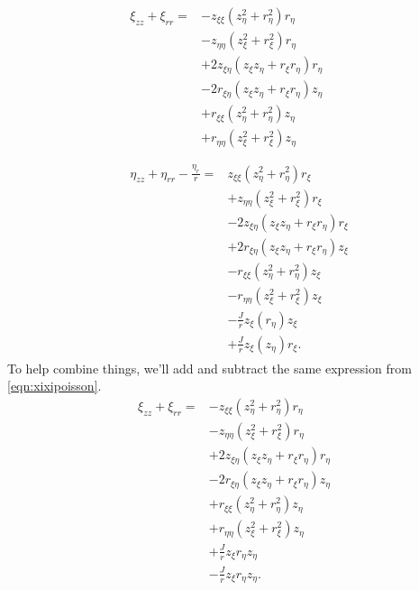 \begin{subequations}
\begin{align}
	&\begin{split}
		\xi_{zz} + \xi_{rr} =&- z_{\xi\xi} ( z_\eta^2 + r_\eta^2)  r_\eta\\
		&- z_{\eta\eta} (z_\xi^2 + r_\xi^2)  r_\eta  \\
		&+ 2z_{\xi\eta} (z_\xi z_\eta + r_\xi r_\eta)  r_\eta   \\
		&- 2r_{\xi\eta} (z_\xi z_\eta + r_\xi  r_\eta)  z_\eta \\
		&+ r_{\xi\xi} ( z_\eta^2 + r_\eta^2)  z_\eta \\
		&+ r_{\eta\eta} (  z_\xi^2  + r_\xi^2) z_\eta  \\
	\end{split} \\[1em]
    \label{eqn:etaetapoisson}
	&\begin{split}
		\eta_{zz} + \eta_{rr} - \frac{\eta_r}{r}=& z_{\xi\xi} (z_\eta^2 +  r_\eta^2)  r_\xi \\
		&+ z_{\eta\eta} (z_\xi^2 + r_\xi^2 )  r_\xi \\
		&- 2z_{\xi\eta} (z_\xi z_\eta + r_\xi r_\eta ) r_\xi  \\
		&+ 2 r_{\xi\eta} ( z_\xi z_\eta +  r_\xi  r_\eta)  z_\xi \\
		&- r_{\xi\xi} ( z_\eta^2 + r_\eta^2 ) z_\xi \\
		&- r_{\eta\eta} (z_\xi^2 + r_\xi^2 ) z_\xi \\
		&- \frac{J}{r}z_\xi( r_\eta ) z_\xi\\
		&+ \frac{J}{r}z_\xi(z_\eta) r_\xi.
	\end{split}
\end{align}
\end{subequations}
%
To help combine things, we'll add and subtract the same expression from \cref{eqn:xixipoisson}.
%
\begin{equation}
    \label{eqn:xixipoisson}
    \begin{aligned}
		\xi_{zz} + \xi_{rr} =&- z_{\xi\xi} ( z_\eta^2 + r_\eta^2)  r_\eta\\
		&- z_{\eta\eta} (z_\xi^2 + r_\xi^2)  r_\eta  \\
		&+ 2z_{\xi\eta} (z_\xi z_\eta + r_\xi r_\eta)  r_\eta   \\
		&- 2r_{\xi\eta} (z_\xi z_\eta + r_\xi  r_\eta)  z_\eta \\
		&+ r_{\xi\xi} ( z_\eta^2 + r_\eta^2)  z_\eta \\
		&+ r_{\eta\eta} (  z_\xi^2  + r_\xi^2) z_\eta  \\
        & + \frac{J}{r}z_\xi r_\eta z_\eta \\
        & - \frac{J}{r}z_\xi r_\eta z_\eta.
    \end{aligned}
\end{equation}
